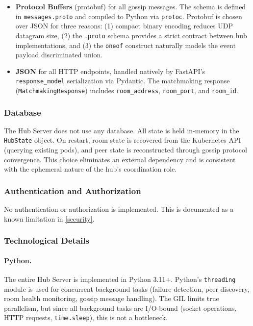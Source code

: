 \begin{itemize}
  \item \textbf{Protocol Buffers} (protobuf) for all gossip messages. The schema is defined in \texttt{messages.proto} and compiled to Python via \texttt{protoc}. Protobuf is chosen over JSON for three reasons: (1) compact binary encoding reduces UDP datagram size, (2) the \texttt{.proto} schema provides a strict contract between hub implementations, and (3) the \texttt{oneof} construct naturally models the event payload discriminated union.

  \item \textbf{JSON} for all HTTP endpoints, handled natively by FastAPI's \texttt{response\_model} serialization via Pydantic. The matchmaking response (\texttt{MatchmakingResponse}) includes \texttt{room\_address}, \texttt{room\_port}, and \texttt{room\_id}.
\end{itemize}

\subsubsection{Database}

The Hub Server does not use any database. All state is held in-memory in the \texttt{HubState} object. On restart, room state is recovered from the Kubernetes API (querying existing pods), and peer state is reconstructed through gossip protocol convergence. This choice eliminates an external dependency and is consistent with the ephemeral nature of the hub's coordination role.

\subsubsection{Authentication and Authorization}

No authentication or authorization is implemented. This is documented as a known limitation in \cref{security}.

\subsubsection{Technological Details}\label{tech-details-hub}

\paragraph{Python.}
The entire Hub Server is implemented in Python 3.11+. Python's \texttt{threading} module is used for concurrent background tasks (failure detection, peer discovery, room health monitoring, gossip message handling). The GIL limits true parallelism, but since all background tasks are I/O-bound (socket operations, HTTP requests, \texttt{time.sleep}), this is not a bottleneck.

